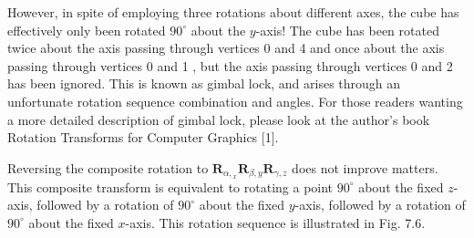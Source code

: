 \documentclass[10pt]{article}
\begin{document}
However, in spite of employing three rotations about different axes, the cube has effectively only been rotated $90^{\circ}$ about the $y$-axis! The cube has been rotated twice about the axis passing through vertices 0 and 4 and once about the axis passing through vertices 0 and 1 , but the axis passing through vertices 0 and 2 has been ignored. This is known as gimbal lock, and arises through an unfortunate rotation sequence combination and angles. For those readers wanting a more detailed description of gimbal lock, please look at the author's book Rotation Transforms for Computer Graphics [1].

Reversing the composite rotation to $\mathbf{R}_{\alpha,{ }_{x}} \mathbf{R}_{\beta, y} \mathbf{R}_{\gamma, z}$ does not improve matters. This composite transform is equivalent to rotating a point $90^{\circ}$ about the fixed $z$-axis, followed by a rotation of $90^{\circ}$ about the fixed $y$-axis, followed by a rotation of $90^{\circ}$ about the fixed $x$-axis. This rotation sequence is illustrated in Fig. 7.6.
\end{document}
